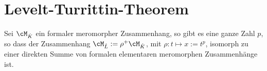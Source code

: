 \section{Levelt-\!Turrittin-\!Theorem}
\begin{comment}
Das Levelt-Turrittin-Theorem ist ein Satz, der hilft, meromorphe Zusammenhänge
in ihre irreduziblen Komponenten zu zerlegen.
\end{comment}

\begin{comment}
\subsection{Klassische Version}
\end{comment}
\begin{thm}
\cite[Thm 5.4.7]{sabbah_cimpa90}
Sei $\cM_{\hat K}$ ein formaler meromorpher Zusammenhang, so gibt es eine
ganze Zahl $p$, so dass der Zusammenhang $\cM_{\hat L}:=\rho^+\cM_{\hat K}$,
mit $\rho:t\mapsto x:=t^p$, isomorph zu einer direkten Summe von formalen
elementaren meromorphen Zusammenhänge
ist.
\end{thm}
\begin{comment}
Der folgende Beweis stammt hauptsächlich aus \cite[Seite 35]{sabbah_cimpa90}.
\end{comment}
